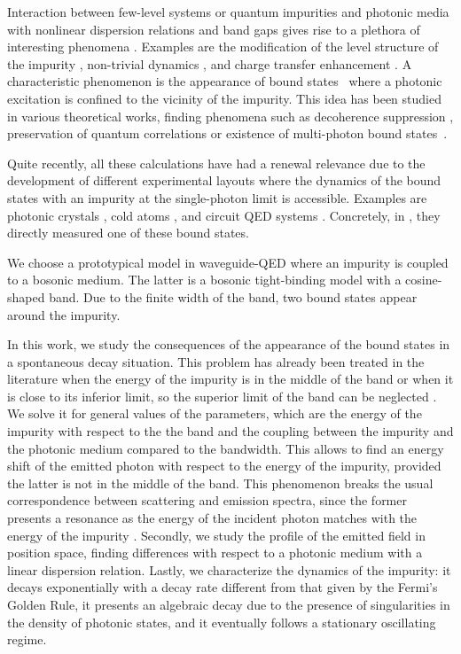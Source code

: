 \documentclass[aps,pra,twocolumn,floatfix,superscriptaddress]{revtex4-1}%
\begin{document}
Interaction between few-level systems or quantum impurities and photonic media with nonlinear dispersion relations and band gaps gives rise to a plethora of interesting phenomena \cite{Lambropoulos2000}. Examples are the modification of the level structure of the impurity \cite{John1990,John1991,Ripoll2015}, non-trivial dynamics \cite{Khalfin1958,Fonda1978,Hack1982,Onley1992,John1994,Gaveau1995,Garmon2013,Redchenko2014,Lombardo2014}, and charge transfer enhancement \cite{Tanaka2006}. %
A characteristic phenomenon is the appearance of bound states\ \cite{John1984,John1987} where a photonic excitation is confined to the vicinity of the impurity. This idea has been studied in various theoretical works, finding phenomena such as decoherence suppression \cite{Tong2010a}, preservation of quantum correlations \cite{Tong2010b,Yang2013,Lu2013} or existence of multi-photon bound states\ \cite{Calajo2016,Shi2016}. {\color{blue}Quite recently, all these calculations have had a renewal relevance due to the development of different experimental layouts where the dynamics of the bound states with an impurity at the single-photon limit is accessible. Examples are photonic crystals \cite{Arcari2014,Sollner2015,Lodahl2015}, cold atoms \cite{goban2015,thompson2013}, and circuit QED systems \cite{Astafiev2010,Hoi2011,Hoi2013,VanLoo2013,Hoi2013b,Liu2017}. Concretely, in \cite{Liu2017}, they directly measured one of these bound states.

We choose a prototypical model in waveguide-QED where an impurity is coupled to a bosonic medium. The latter is a bosonic tight-binding model with a cosine-shaped band. Due to the finite width of the band, two bound states appear around the impurity. 

In this work, we study the consequences of the appearance of the bound states in a spontaneous decay situation. This problem has already been treated in the literature when the energy of the impurity is in the middle of the band \cite{Lombardo2014} or when it is close to its inferior limit, so the superior limit of the band can be neglected \cite{Garmon2013}. We solve it for general values of the parameters, which are the energy of the impurity with respect to the the band and the coupling between the impurity and the photonic medium compared to the bandwidth. This allows to find an energy shift of the emitted photon with respect to the energy of the impurity, provided the latter is not in the middle of the band. This phenomenon breaks the usual correspondence between scattering and emission spectra, since the former presents a resonance as the energy of the incident photon matches with the energy of the impurity \cite{Nori2008a, Fan2005a, Fan2005b}. Secondly, we study the profile of the emitted field in position space, finding differences with respect to a photonic medium with a linear dispersion relation. Lastly, we characterize the dynamics of the impurity: it decays exponentially with a decay rate different from that given by the Fermi's Golden Rule, it presents an algebraic decay due to the presence of singularities in the density of photonic states, and it eventually follows a stationary oscillating regime.}
\end{document}
